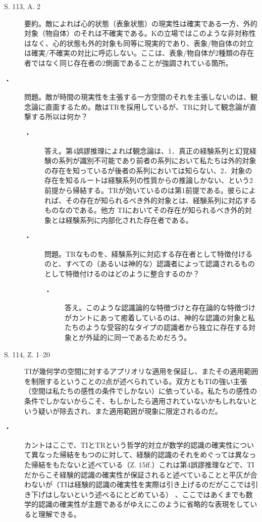 \documentclass[a4j, 12pt,leqno]{jsarticle}
\begin{document}
\begin{description}
\item[S. 113, A. 2]要約。敵によれば心的状態（表象状態）の現実性は確実である一方、外的対象（物自体）のそれは不確実である。Kの立場ではこのような非対称性はなく、心的状態も外的対象も同等に現実的であり、表象/物自体の対立は確実/不確実の対比に呼応しない。ここは、表象/物自体が2種類の存在者ではなく同じ存在者の2側面であることが強調されている箇所。
\item[・] 問題。敵が時間の現実性を主張する一方空間のそれを主張しないのは、観念論に直面するため。敵はTRを採用しているが、TRに対して観念論が直撃する所以は何か？
\begin{description}
\item[・]答え。第4誤謬推理によれば観念論は、1．真正の経験系列と幻覚経験の系列が識別不可能であり前者の系列において私たちは外的対象の存在を知っているが後者の系列においては知らない、2．対象の存在を知るルートは経験系列の性質からの推論しかない、という2前提から帰結する。TRが効いているのは第1前提である。彼らによれば、その存在が知られるべき外的対象とは、経験系列に対応するものなのである。他方 TIにおいてその存在が知られるべき外的対象とは経験系列に内部化された存在者である。
\item[・]問題。TRなものを、経験系列に対応する存在者として特徴付けるのと、すべての（あるいは神的な）認識者によって認識されるものとして特徴付けるのはどのように整合するのか？
\begin{description}
\item[・]答え。このような認識論的な特徴づけと存在論的な特徴づけがカントにあって癒着しているのは、神的な認識の対象と私たちのような受容的なタイプの認識者から独立に存在する対象とが外延的に同一であるためだろう。
\end{description}
\end{description}
\item[S. 114, Z. 1--20]TIが幾何学の空間に対するアプリオリな適用を保証し、またその適用範囲を制限するということの2点が述べられている。双方ともTIの強い主張（空間は私たちの感性の条件でしかない）に依っている。私たちの感性の条件でしかないからこそ、もしかしたら適用されていないかもしれないという疑いが除去され、また適用範囲が現象に限定されるのだ。
\item[・]
カントはここで、TIとTRという哲学的対立が数学的認識の確実性について異なった帰結をもつのに対して、経験的認識のそれをめぐっては異なった帰結をもたないと述べている（Z. 15ff.）これは第4誤謬推理などで、TIだからこそ経験的認識の確実性が保証されると述べていることと平仄が合わないが（TIは経験的認識の確実性を実際は引き上げるのだがここでは引き下げはしないという述べるにとどめている） 、ここではあくまでも数学的認識の確実性が主題であるがゆえにこのように省略的な表現をしていると理解できる。
\end{description}
\end{document}
